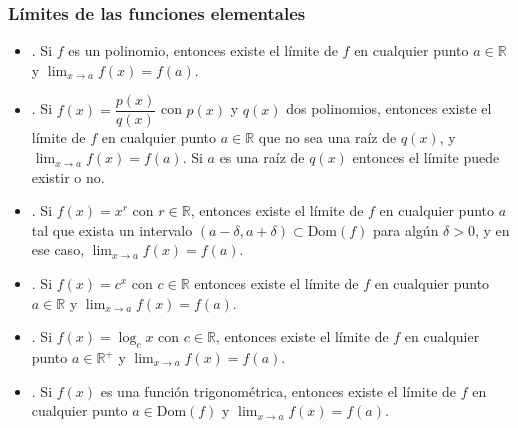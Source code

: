 	\begin{frame}
		\frametitle{Límites de las funciones elementales}
		\begin{itemize}
			\item {}. Si $f$ es un polinomio, entonces existe el límite de $f$ en cualquier
			      punto $a\in \mathbb{R}$ y $\lim_{x\rightarrow a}f(x)=f(a)$. 
			\item {}. Si $f(x)=\dfrac{p(x)}{q(x)}$ con $p(x)$ y $q(x)$ dos polinomios,
			      entonces existe el límite de $f$ en cualquier punto $a\in \mathbb{R}$ que no sea una raíz de $q(x)$, y $\lim_{x\rightarrow a}f(x)=f(a)$. Si $a$ es una raíz de $q(x)$ entonces el límite puede existir o no.
			\item {}. Si $f(x)=x^r$ con $r\in \mathbb{R}$, entonces existe el límite de $f$
			      en cualquier punto $a$ tal que exista un intervalo $(a-\delta,a+\delta)\subset \textrm{Dom}(f)$ para algún $\delta >0$, y en ese caso, $\lim_{x\rightarrow a}f(x)=f(a)$.
			\item {}. Si $f(x)=c^x$ con $c\in \mathbb{R}$ entonces existe el límite de $f$
			      en cualquier punto $a\in \mathbb{R}$ y $\lim_{x\rightarrow a}f(x)=f(a)$.
			\item {}. Si $f(x)=\log_cx$ con $c\in \mathbb{R}$, entonces existe el límite de
			      $f$ en cualquier  punto $a\in \mathbb{R}^+$ y $\lim_{x\rightarrow a}f(x)=f(a)$.
			\item {}. Si $f(x)$ es una función trigonométrica, entonces existe el límite
			      de $f$ en cualquier punto $a\in \textrm{Dom}(f)$ y $\lim_{x\rightarrow a}f(x)=f(a)$.
		\end{itemize}
	\end{frame}
	
	
	
